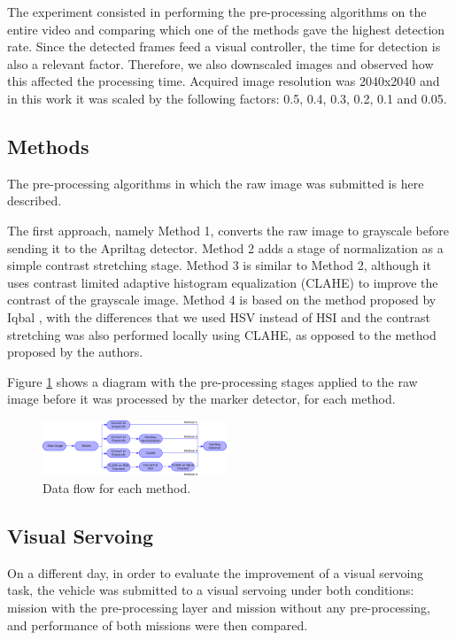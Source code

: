 \documentclass[conference, letterpaper]{IEEEtran}
\begin{document}
The experiment consisted in performing the pre-processing algorithms on the
entire video and comparing which one of the methods gave the highest detection
rate. Since the detected frames feed a visual controller, the time for
detection is also a relevant factor. Therefore, we also downscaled images and
observed how this affected the processing time. Acquired image resolution was
2040x2040 and in this work it was scaled by the following factors: 0.5, 0.4, 0.3, 0.2,
0.1 and 0.05.

\subsection{Methods}

The pre-processing algorithms in which the raw image was submitted is here described. 

The first approach, namely Method 1, converts the raw image to grayscale
before sending it to the Apriltag detector. Method 2 adds a stage of
normalization as a simple contrast stretching stage. Method 3 is similar to
Method 2, although it uses contrast limited adaptive histogram equalization (CLAHE)
\cite{zuiderveld1994contrast} to improve the contrast of the grayscale image.
Method 4 is based on the method proposed by Iqbal \cite{iqbal2007underwater},
with the differences that we used HSV instead of HSI and the contrast stretching was
also performed locally using CLAHE, as opposed to the method proposed by
the authors.

Figure \ref{fig:methods_flow} shows a diagram with the pre-processing stages
applied to the raw image before it was processed by the marker detector, for each
method. 

\begin{figure}[!htpb]
    \centering
    \includegraphics[width=0.49\textwidth]{./fig/processing_flow2.png}
    \caption{Data flow for each method.}
    \label{fig:methods_flow}
\end{figure}


\subsection{Visual Servoing}

On a different day, in order to evaluate the improvement of a visual servoing
task, the vehicle was submitted to a visual servoing under both conditions:
mission with the pre-processing layer and mission without any pre-processing,
and performance of both missions were then compared.
\end{document}
